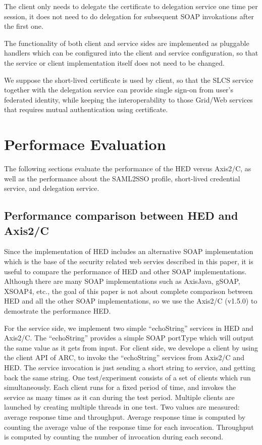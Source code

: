 \documentclass[conference]{IEEEtran}
\begin{document}
The client only needs to delegate the certificate to delegation service one time per session, it does
not need to do delegation for subsequent SOAP invokations after the first one.

The functionality of both client and service sides are implemented as pluggable handlers which can be 
configured into the client and service configuration, so that the service or client implementation itself
does not need to be changed.

We suppose the short-lived certificate is used by client, so that the SLCS service together with
the delegation service can provide single sign-on from user's federated identity, while keeping the 
interoperability to those Grid/Web services that requires mutual authentication using certificate.

\section{Performace Evaluation}
\label{sec:perfeval}
The following sections evaluate the performance of the HED versus Axis2/C, as 
well as the performance about the SAML2SSO profile, short-lived credential
service, and delegation service.

\subsection{Performance comparison between HED and Axis2/C}
\label{sec:perhedandaxis}
Since the implementation of HED includes an alternative SOAP implementation which is the base of 
the security related web servies described in this paper, it is useful to compare the performance 
of HED and other SOAP implementations. Although there are many SOAP implementations such as 
AxisJava, gSOAP, XSOAP4, etc., the goal of this paper is not about complete comparison between
HED and all the other SOAP implementations, so we use the Axis2/C (v1.5.0) to demostrate the performance
HED.

For the service side, we implement two simple ``echoString'' services in HED and Axis2/C. The 
``echoString'' provides a simple SOAP portType which will output the same value as it gets from
input.
For client side, we develope a client by using the client API of ARC, to invoke the ``echoString''
services from Axis2/C and HED. The service invocation is just sending a short string to service, and 
getting back the same string. One test/experiment consists of a set of clients which run simultaneously. 
Each client runs for a fixed period of time, and invokes the service as many times as it can during 
the test period. Multiple clients are launched by creating multiple threads in one test.
Two values are measured: average response time and throughput. Average response time is computed
by counting the average value of the response time for each invocation. Throughput is computed
by counting the number of invocation during each second.
\end{document}
